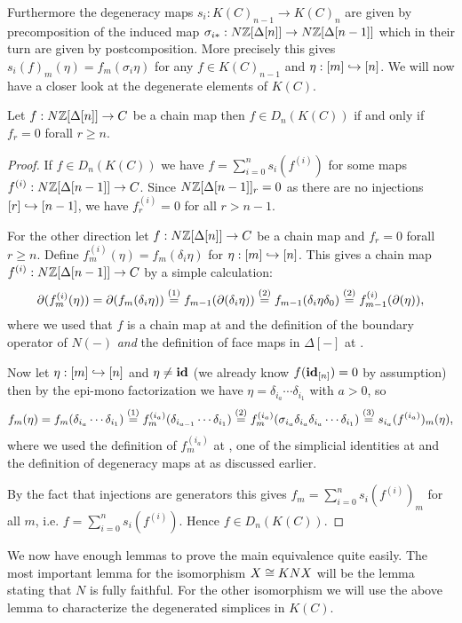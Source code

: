 Furthermore the degeneracy maps $s_i: K(C)_{n-1} \to K(C)_n$ are given by precomposition of the induced map $\sigma_{i\ast}: N\mathbb{Z}[\Delta[n]] \to N\mathbb{Z}[\Delta[n-1]]$ which in their turn are given by postcomposition. More precisely this gives $s_i(f)_m(\eta) = f_m(\sigma_i \eta)$ for any $f \in K(C)_{n-1}$ and $\eta: [m] \hookrightarrow [n]$. We will now have a closer look at the degenerate elements of $K(C)$.
\begin{lemma}
	\label{le:degen_k}
	Let $f: N\mathbb{Z}[\Delta[n]] \to C$ be a chain map then $f \in D_n(K(C))$ if and only if $f_r = 0$ forall $r \geq n$.
\end{lemma}
\begin{proof}
	If $f \in D_n(K(C))$ we have $f = \sum_{i=0}^n s_i(f^{(i)})$ for some maps $f^{(i)}: N\mathbb{Z}[\Delta[n-1]] \to C$. Since $N\mathbb{Z}[\Delta[n-1]]_r = 0$ as there are no injections $[r] \hookrightarrow [n-1]$, we have $f^{(i)}_r = 0$ for all $r > n-1$.

	For the other direction let $f: N\mathbb{Z}[\Delta[n]] \to C$ be a chain map and $f_r = 0$ forall $r \geq n$. Define $f_m^{(i)}(\eta) = f_m(\delta_i \eta)$ for $\eta: [m] \hookrightarrow [n]$. This gives a chain map $f^{(i)}: N\mathbb{Z}[\Delta[n-1]] \to C$ by a simple calculation:
	$$ \partial(f_m^{(i)}(\eta)) = \partial(f_m(\delta_i \eta)) \stackrel{(1)}{=} f_{m-1}(\partial(\delta_i \eta)) \stackrel{(2)}{=} f_{m-1}(\delta_i \eta \delta_0) \stackrel{(2)}{=} f_{m-1}^{(i)}(\partial(\eta)), $$
	where we used that $f$ is a chain map at  and the definition of the boundary operator of $N(-)$ \emph{and} the definition of face maps in $\Delta[-]$ at .

	Now let $\eta: [m] \hookrightarrow [n]$ and $\eta \neq \mathbf{id}$ (we already know $f(\mathbf{id}_{[n]})=0$ by assumption) then by the epi-mono factorization we have $\eta = \delta_{i_a} \cdots \delta_{i_1}$ with $a>0$, so
	$$ f_m(\eta) = f_m(\delta_{i_a} \cdots \delta_{i_1}) \stackrel{(1)}{=} f_m^{(i_a)}(\delta_{i_{a-1}} \cdots \delta_{i_1}) \stackrel{(2)}{=} f_m^{(i_a)}(\sigma_{i_a} \delta_{i_a} \delta_{i_a} \cdots \delta_{i_1}) \stackrel{(3)}{=} s_{i_a}(f^{(i_a)})_m(\eta), $$
	where we used the definition of $f_m^{(i_a)}$ at , one of the simplicial identities at  and the definition of degeneracy maps at  as discussed earlier.

	By the fact that injections are generators this gives $f_m = \sum_{i=0}^n s_i(f^{(i)})_m$ for all $m$, i.e. $f = \sum_{i=0}^n s_i(f^{(i)})$. Hence $f \in D_n(K(C))$.
\end{proof}

We now have enough lemmas to prove the main equivalence quite easily. The most important lemma for the isomorphism $X \cong KNX$ will be the lemma stating that $N$ is fully faithful. For the other isomorphism we will use the above lemma to characterize the degenerated simplices in $K(C)$.

